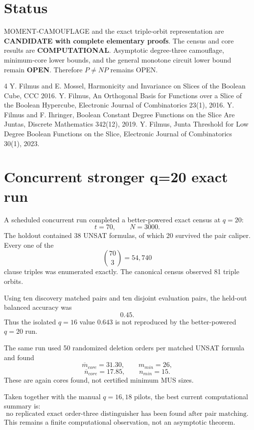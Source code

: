 \documentclass[11pt]{article}
\begin{document}
\section{Status}
MOMENT-CAMOUFLAGE and the exact triple-orbit representation are \textbf{CANDIDATE with complete elementary proofs}. The census and core results are \textbf{COMPUTATIONAL}. Asymptotic degree-three camouflage, minimum-core lower bounds, and the general monotone circuit lower bound remain \textbf{OPEN}. Therefore \(P\ne NP\) remains OPEN.

\begin{thebibliography}{4}
 Y. Filmus and E. Mossel, Harmonicity and Invariance on Slices of the Boolean Cube, CCC 2016.
 Y. Filmus, An Orthogonal Basis for Functions over a Slice of the Boolean Hypercube, Electronic Journal of Combinatorics 23(1), 2016.
 Y. Filmus and F. Ihringer, Boolean Constant Degree Functions on the Slice Are Juntas, Discrete Mathematics 342(12), 2019.
 Y. Filmus, Junta Threshold for Low Degree Boolean Functions on the Slice, Electronic Journal of Combinatorics 30(1), 2023.
\end{thebibliography}

\section{Concurrent stronger q=20 exact run}

A scheduled concurrent run completed a better-powered exact census at \(q=20\):
\[
t=70,\qquad N=3000.
\]
The holdout contained 38 UNSAT formulas, of which 20 survived the pair caliper. Every one of the
\[
\binom{70}{3}=54{,}740
\]
clause triples was enumerated exactly. The canonical census observed 81 triple orbits.

Using ten discovery matched pairs and ten disjoint evaluation pairs, the held-out balanced accuracy was
\[
\boxed{0.45}.
\]
Thus the isolated \(q=16\) value \(0.643\) is not reproduced by the better-powered \(q=20\) run.

The same run used 50 randomized deletion orders per matched UNSAT formula and found
\[
\overline m_{core}=31.30,\qquad m_{min}=26,
\]
\[
\overline n_{core}=17.85,\qquad n_{min}=15.
\]
These are again cores found, not certified minimum MUS sizes.

Taken together with the manual \(q=16,18\) pilots, the best current computational summary is:
\[
\boxed{\text{no replicated exact order-three distinguisher has been found after pair matching.}}
\]
This remains a finite computational observation, not an asymptotic theorem.
\end{document}
